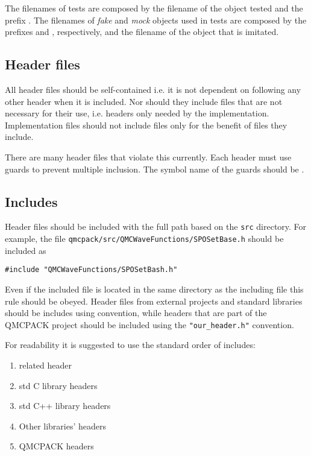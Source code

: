 The filenames of tests are composed by the filename of the object tested and the prefix .
The filenames of \emph{fake} and \emph{mock} objects used in tests are composed by the prefixes  and , respectively, and the filename of the object that is imitated.

\subsection{Header files}
All header files should be self-contained i.e. it is not dependent on following any other header when it is included. Nor should they include files that are not necessary for their use, i.e. headers only needed by the implementation. Implementation files should not include files only for the benefit of files they include.

There are many header files that violate this currently.
Each header must use  guards to prevent multiple inclusion.
The symbol name of the  guards should be .

\subsection{Includes}
Header files should be included with the full path based on the \verb|src| directory.
For example, the file \verb|qmcpack/src/QMCWaveFunctions/SPOSetBase.h| should be included as
\begin{lstlisting}
#include "QMCWaveFunctions/SPOSetBash.h"
\end{lstlisting}
Even if the included file is located in the same directory as the including file this rule should be obeyed. Header files from external projects and standard libraries should be includes using  convention, while headers that are part of the QMCPACK project should be included using the \verb|"our_header.h"| convention.

For readability it is suggested to use the standard order of includes:
\begin{enumerate}
	\item related header
	\item std C library headers
	\item std C++ library headers
	\item Other libraries' headers
	\item QMCPACK headers
\end{enumerate}

